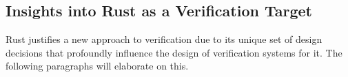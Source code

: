 \documentclass[twoside, english]{sdqthesis}
\theoremstyle{definition}
\begin{document}




\subsection{Insights into Rust as a Verification Target}


Rust justifies a new approach to verification due to its unique set of design decisions that profoundly influence the design of verification systems for it. The following paragraphs will elaborate on this.

\end{document}
